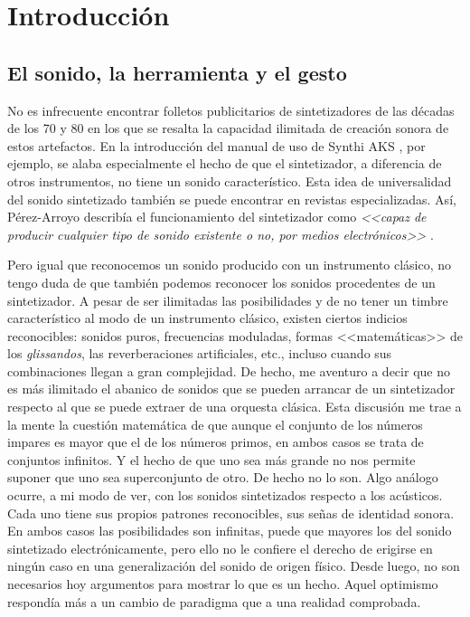 \chapter[Introducción]{Introducción}

\section{El sonido, la herramienta y el gesto}


No es infrecuente encontrar folletos publicitarios de sintetizadores de las décadas de los 70 y 80 en los que se resalta la capacidad ilimitada de creación sonora de estos artefactos. En la introducción del manual de uso de Synthi AKS \cite{SynthiAKS_brochure}, por ejemplo, se alaba especialmente el hecho de que el sintetizador, a diferencia de otros instrumentos, no tiene un sonido característico. Esta idea de universalidad del sonido sintetizado también se puede encontrar en revistas especializadas. Así, Pérez-Arroyo describía el funcionamiento del sintetizador como \textit{<<capaz de producir cualquier tipo de sonido existente o no, por medios electrónicos>>} \cite{ritmo_542}. 

Pero igual que reconocemos un sonido producido con un instrumento clásico, no tengo duda de que también podemos reconocer los sonidos procedentes de un sintetizador. A pesar de ser ilimitadas las posibilidades y de no tener un timbre característico al modo de un instrumento clásico, existen ciertos indicios reconocibles: sonidos puros, frecuencias moduladas, formas <<matemáticas>> de los \textit{glissandos}, las reverberaciones artificiales, etc., incluso cuando sus combinaciones llegan a gran complejidad. De hecho, me aventuro a decir que no es más ilimitado el abanico de sonidos que se pueden arrancar de un sintetizador respecto al que se puede extraer de una orquesta clásica. Esta discusión me trae a la mente la cuestión matemática de que aunque el conjunto de los números impares es mayor que el de los números primos, en ambos casos se trata de conjuntos infinitos. Y el hecho de que uno sea más grande no nos permite suponer que uno sea superconjunto de otro. De hecho no lo son. Algo análogo ocurre, a mi modo de ver, con los sonidos sintetizados respecto a los acústicos. Cada uno tiene sus propios patrones reconocibles, sus señas de identidad sonora. En ambos casos las posibilidades son infinitas, puede que mayores los del sonido sintetizado electrónicamente, pero ello no le confiere el derecho de erigirse en ningún caso en una generalización del sonido de origen físico. Desde luego, no son necesarios hoy argumentos para mostrar lo que es un hecho. Aquel optimismo respondía más a un cambio de paradigma que a una realidad comprobada.

